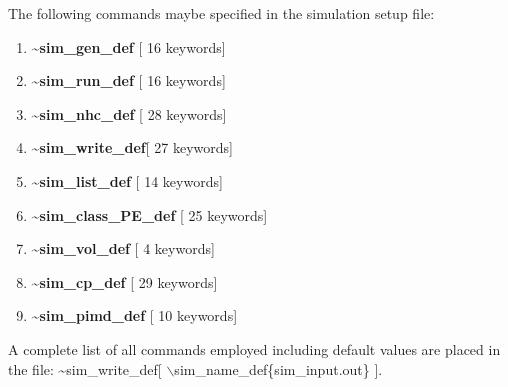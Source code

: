 The following commands maybe specified in the simulation setup file:
\begin{enumerate}
\LARGE
\item {\bf \~{}sim\_gen\_def} [ 16 keywords]
\item {\bf \~{}sim\_run\_def} [ 16 keywords]
\item {\bf \~{}sim\_nhc\_def} [ 28 keywords]
\item {\bf \~{}sim\_write\_def}[ 27 keywords]
\item {\bf \~{}sim\_list\_def} [ 14 keywords]
\item {\bf \~{}sim\_class\_PE\_def} [ 25 keywords]
\item {\bf \~{}sim\_vol\_def} [ 4 keywords]
\item {\bf \~{}sim\_cp\_def} [ 29 keywords]
\item {\bf \~{}sim\_pimd\_def} [ 10 keywords]
\end{enumerate}
\large
A complete list of all commands employed including default
values are placed in the file:
\~{}sim\_write\_def[ $\backslash$sim\_name\_def\{sim\_input.out\} ]. 


\clearpage

